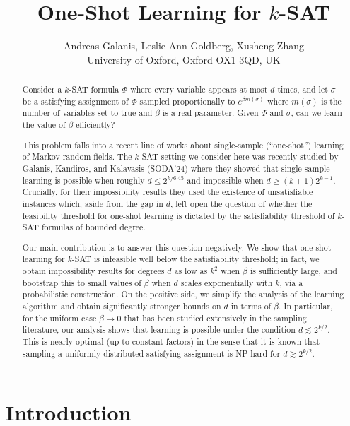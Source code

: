 \documentclass[11pt]{article}
\title{One-Shot Learning for $k$-SAT}
\author{
 Andreas Galanis, Leslie Ann Goldberg, Xusheng Zhang \\
  \small University of Oxford, Oxford OX1 3QD, UK
}
\theoremstyle{definition}
\theoremstyle{remark}
\begin{document}
\maketitle
\begin{abstract}
Consider  a $k$-SAT formula $\Phi$ where every variable appears at most $d$ times, and let $\sigma$ be a satisfying assignment of $\Phi$ sampled proportionally to $e^{\beta m(\sigma)}$ where $m(\sigma)$ is the number of variables set to true and $\beta$ is a real parameter. Given $\Phi$ and $\sigma$, can we learn the value of $\beta$ efficiently?

This problem falls into a recent line of works about single-sample (``one-shot'') learning of Markov random fields. The $k$-SAT setting we consider here was recently studied  by Galanis, Kandiros, and Kalavasis (SODA'24) where they showed that single-sample learning is possible when roughly $d\leq 2^{k/6.45}$ and  impossible when $d\geq (k+1) 2^{k-1}$. Crucially, for their impossibility results they used the existence of unsatisfiable instances which, aside from the gap in $d$, left open the question of whether the feasibility threshold for one-shot learning is dictated by the satisfiability threshold of $k$-SAT formulas of bounded degree. 


Our main contribution is to answer this question negatively. We show that one-shot learning for $k$-SAT is infeasible well below the satisfiability threshold; in fact, we obtain impossibility results for degrees $d$ as low as $k^2$ when $\beta$ is sufficiently large, and bootstrap this to small values of $\beta$ when $d$ scales exponentially with $k$, via a probabilistic construction.  On the positive side, we simplify the analysis of the learning algorithm and obtain significantly stronger bounds on $d$ in terms of $\beta$. In particular, for the uniform case $\beta\rightarrow 0$ that has been studied extensively in the sampling literature, our analysis shows that learning is possible under the condition $d\lesssim 2^{k/2}$. This is nearly optimal (up to constant factors) in the sense that it is known that  sampling a uniformly-distributed satisfying assignment is NP-hard for $d\gtrsim 2^{k/2}$. 
\end{abstract}
\let\thefootnote\relax{}
\section{Introduction}
\end{document}
